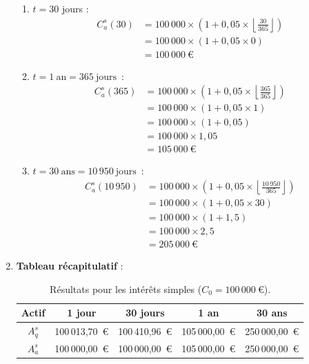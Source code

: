 \documentclass{article}
\begin{document}
\begin{enumerate}[label=\textbf{Q\arabic*.}]
\begin{enumerate}[label=(\alph*)]
        \item \( t = 30 \) jours : 
        \begin{align*}
        C_a^s(30) &= 100\,000 \times \left(1 + 0,05 \times \left\lfloor \frac{30}{365} \right\rfloor \right) \\
                 &= 100\,000 \times \left(1 + 0,05 \times 0 \right) \\
                 &= \boxed{100\,000\ \text{€}}
        \end{align*}
        
        \item $t = 1\ \text{an} = 365\ \text{jours}$~: 
        \begin{align*}
        C_a^s(365) &= 100\,000 \times \left(1 + 0,05 \times \left\lfloor \frac{365}{365} \right\rfloor \right) \\
                 &= 100\,000 \times \left(1 + 0,05 \times 1 \right) \\
                 &= 100\,000 \times \left(1 + 0,05 \right) \\
                 &= 100\,000 \times 1,05 \\
                 &= \boxed{105\,000\ \text{€}}
        \end{align*}
        
        \item $t = 30\ \text{ans} = 10\,950\ \text{jours}$~: 
        \begin{align*}
        C_a^s(10\,950) &= 100\,000 \times \left(1 + 0,05 \times \left\lfloor \frac{10\,950}{365} \right\rfloor \right) \\
                 &= 100\,000 \times \left(1 + 0,05 \times 30 \right) \\
                 &= 100\,000 \times \left(1 + 1,5 \right) \\
                 &= 100\,000 \times 2,5 \\
                 &= \boxed{205\,000\ \text{€}}
        \end{align*}
    \end{enumerate}

    \item \textbf{Tableau récapitulatif} :\\
    \begin{table}[h!]
        \centering
        \begin{tabular}{|c|c|c|c|c|}
        \hline
        \textbf{Actif} & \textbf{1 jour} & \textbf{30 jours} & \textbf{1 an} & \textbf{30 ans} \\
        \hline
        \( A_q^s \) & 100\,013,70\ € & 100\,410,96\ € & 105\,000,00\ € & 250\,000,00\ € \\
        \hline
        \( A_a^s \) & 100\,000,00\ € & 100\,000,00\ € & 105\,000,00\ € & 250\,000,00\ € \\
        \hline
        \end{tabular}
        \caption{Résultats pour les intérêts simples (\( C_0 = 100\,000\ \text{€} \)).}
        \label{tab:simple_interest_results}
    \end{table}


\end{enumerate}
\end{document}
